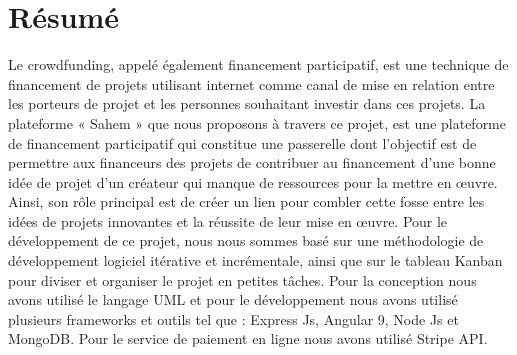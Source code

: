 \chapter*{Résumé}
%
Le crowdfunding, appelé également financement participatif, est une technique de financement de projets utilisant internet comme canal de mise en relation entre les porteurs de projet et les personnes souhaitant investir dans ces projets.
La plateforme « Sahem » que nous proposons à travers ce projet, est une plateforme de financement participatif qui constitue une passerelle dont l’objectif est de permettre aux financeurs des projets de contribuer au financement d'une bonne idée de projet d’un créateur qui manque de ressources pour la mettre en œuvre. Ainsi, son rôle principal est de créer un lien pour combler cette fosse entre les idées de projets innovantes et la réussite de leur mise en œuvre. Pour le développement de ce projet, nous nous sommes basé sur une méthodologie de développement logiciel itérative et incrémentale, ainsi que sur le tableau Kanban pour diviser et organiser le projet en petites tâches. Pour la conception nous avons utilisé le langage UML et pour le développement nous avons utilisé plusieurs frameworks et outils tel que : Express Js, Angular 9, Node Js et MongoDB. Pour le service de paiement en ligne nous avons utilisé Stripe API.





